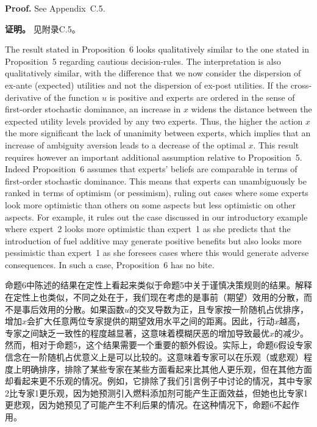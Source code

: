 \documentclass[12pt,a4paper]{article}
\newenvironment{original}
  {\par\noindent\ignorespaces}
  {\par}
\newenvironment{translation}
  {\par\noindent{\color{transblue}\ignorespaces}}
  {\par\medskip}
\begin{document}
\begin{original}
\textbf{Proof.} See Appendix~C.5.
\end{original}

\begin{translation}
\textbf{证明。} 见附录C.5。
\end{translation}

\begin{original}
The result stated in Proposition~6 looks qualitatively similar to the one stated in Proposition~5 regarding cautious decision-rules. The interpretation is also qualitatively similar, with the difference that we now consider the dispersion of ex-ante (expected) utilities and not the dispersion of ex-post utilities. If the cross-derivative of the function $u$ is positive and experts are ordered in the sense of first-order stochastic dominance, an increase in $x$ widens the distance between the expected utility levels provided by any two experts. Thus, the higher the action $x$ the more significant the lack of unanimity between experts, which implies that an increase of ambiguity aversion leads to a decrease of the optimal $x$. This result requires however an important additional assumption relative to Proposition~5. Indeed Proposition~6 assumes that experts' beliefs are comparable in terms of first-order stochastic dominance. This means that experts can unambiguously be ranked in terms of optimism (or pessimism), ruling out cases where some experts look more optimistic than others on some aspects but less optimistic on other aspects. For example, it rules out the case discussed in our introductory example where expert~2 looks more optimistic than expert~1 as she predicts that the introduction of fuel additive may generate positive benefits but also looks more pessimistic than expert~1 as she foresees cases where this would generate adverse consequences. In such a case, Proposition~6 has no bite.
\end{original}

\begin{translation}
命题6中陈述的结果在定性上看起来类似于命题5中关于谨慎决策规则的结果。解释在定性上也类似，不同之处在于，我们现在考虑的是事前（期望）效用的分散，而不是事后效用的分散。如果函数$u$的交叉导数为正，且专家按一阶随机占优排序，增加$x$会扩大任意两位专家提供的期望效用水平之间的距离。因此，行动$x$越高，专家之间缺乏一致性的程度越显著，这意味着模糊厌恶的增加导致最优$x$的减少。然而，相对于命题5，这个结果需要一个重要的额外假设。实际上，命题6假设专家信念在一阶随机占优意义上是可以比较的。这意味着专家可以在乐观（或悲观）程度上明确排序，排除了某些专家在某些方面看起来比其他人更乐观，但在其他方面却看起来更不乐观的情况。例如，它排除了我们引言例子中讨论的情况，其中专家2比专家1更乐观，因为她预测引入燃料添加剂可能产生正面效益，但她也比专家1更悲观，因为她预见了可能产生不利后果的情况。在这种情况下，命题6不起作用。
\end{translation}
\end{document}

